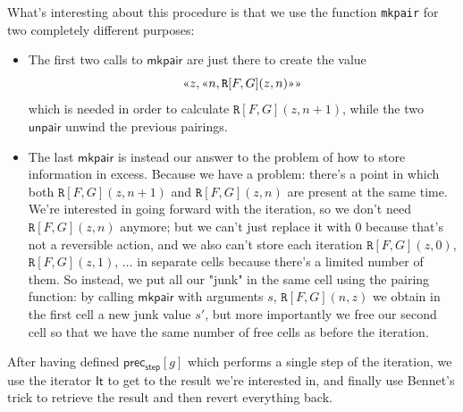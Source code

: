\documentclass[oneside]{book}
\theoremstyle{definition}
\theoremstyle{remark}
\theoremstyle{plain}
\newcommand{\gl}{\text{\guillemotleft}}
\newcommand{\gr}{\text{\guillemotright}}
\newcommand{\rppIt}{\mathsf{It}}
\newcommand{\rppmkpair}{\mathsf{mkpair}}
\newcommand{\rppunpair}{\mathsf{unpair}}
\newcommand{\rppprecstep}{\mathsf{prec_{step}}}
\newcommand{\prPrec}{\mathtt{R}}
\begin{document}
What's interesting about this procedure is that we use the function \lstinline{mkpair} for
two completely different purposes:
\begin{itemize}
\item The first two calls to $\rppmkpair$ are just there to create the value
\[ \gl z, \gl n, \prPrec[F,G](z,n) \gr \gr \]
which is needed in order to calculate $\prPrec[F,G](z,n+1)$, while the two $\rppunpair$ unwind the previous pairings.
\item The last $\rppmkpair$ is instead our answer to the problem of how to store information in excess.
Because we have a problem: there's a point in which both $\prPrec[F,G](z,n+1)$ and $\prPrec[F,G](z,n)$ are present at the same time.
We're interested in going forward with the iteration, so we don't need $\prPrec[F,G](z,n)$ anymore;
but we can't just replace it with $0$ because that's not a reversible action,
and we also can't store each iteration $\prPrec[F,G](z,0)$, $\prPrec[F,G](z,1)$, $\dots$ in
separate cells because there's a limited number of them.
So instead, we put all our "junk" in the same cell using the pairing function:
by calling $\rppmkpair$ with arguments $s$, $\prPrec[F,G](n,z)$ we obtain in the first cell a new junk value $s'$, but more importantly
we free our second cell so that we have the same number of free cells as before the iteration.
\end{itemize}

After having defined $\rppprecstep[g]$ which performs a single step of the iteration,
we use the iterator $\rppIt$ to get to the result we're interested in,
and finally use Bennet's trick to retrieve the result and then revert everything back.
\end{document}
